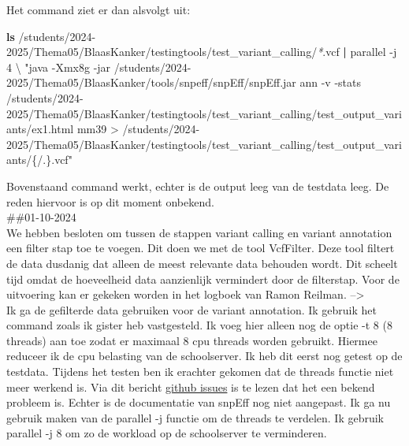 \documentclass[
]{article}
\newenvironment{Shaded}{\begin{snugshade}}{\end{snugshade}}
\newcommand{\AttributeTok}[1]{\textcolor[rgb]{0.13,0.29,0.53}{#1}}
\newcommand{\DataTypeTok}[1]{\textcolor[rgb]{0.13,0.29,0.53}{#1}}
\newcommand{\ExtensionTok}[1]{#1}
\newcommand{\FunctionTok}[1]{\textcolor[rgb]{0.13,0.29,0.53}{\textbf{#1}}}
\newcommand{\KeywordTok}[1]{\textcolor[rgb]{0.13,0.29,0.53}{\textbf{#1}}}
\newcommand{\NormalTok}[1]{#1}
\newcommand{\PreprocessorTok}[1]{\textcolor[rgb]{0.56,0.35,0.01}{\textit{#1}}}
\newcommand{\StringTok}[1]{\textcolor[rgb]{0.31,0.60,0.02}{#1}}
\begin{document}
Het command ziet er dan alsvolgt uit:\\

\begin{Shaded}
\begin{Highlighting}[]
\FunctionTok{ls}\NormalTok{ /students/2024{-}2025/Thema05/BlaasKanker/testingtools/test\_variant\_calling/}\PreprocessorTok{*}\NormalTok{.vcf }\KeywordTok{|} \ExtensionTok{parallel} \AttributeTok{{-}j}\NormalTok{ 4 }\DataTypeTok{\textbackslash{}}
\StringTok{"java {-}Xmx8g {-}jar /students/2024{-}2025/Thema05/BlaasKanker/tools/snpeff/snpEff/snpEff.jar ann {-}v {-}stats /students/2024{-}2025/Thema05/BlaasKanker/testingtools/test\_variant\_calling/test\_output\_variants/ex1.html mm39 \textgreater{} /students/2024{-}2025/Thema05/BlaasKanker/testingtools/test\_variant\_calling/test\_output\_variants/\{/.\}.vcf"}
\end{Highlighting}
\end{Shaded}

Bovenstaand command werkt, echter is de output leeg van de testdata
leeg. De reden hiervoor is op dit moment onbekend.\\

\#\#01-10-2024\\
We hebben besloten om tussen de stappen variant calling en variant
annotation een filter stap toe te voegen. Dit doen we met de tool
VcfFilter. Deze tool filtert de data dusdanig dat alleen de meest
relevante data behouden wordt. Dit scheelt tijd omdat de hoeveelheid
data aanzienlijk vermindert door de filterstap. Voor de uitvoering kan
er gekeken worden in het logboek van Ramon Reilman. --\textgreater{}\\

Ik ga de gefilterde data gebruiken voor de variant annotation. Ik
gebruik het command zoals ik gister heb vastgesteld. Ik voeg hier alleen
nog de optie -t 8 (8 threads) aan toe zodat er maximaal 8 cpu threads
worden gebruikt. Hiermee reduceer ik de cpu belasting van de
schoolserver. Ik heb dit eerst nog getest op de testdata. Tijdens het
testen ben ik erachter gekomen dat de threads functie niet meer werkend
is. Via dit bericht
\href{https://github.com/pcingola/SnpEff/issues/429}{github issues} is
te lezen dat het een bekend probleem is. Echter is de documentatie van
snpEff nog niet aangepast. Ik ga nu gebruik maken van de parallel -j
functie om de threads te verdelen. Ik gebruik parallel -j 8 om zo de
workload op de schoolserver te verminderen.\\
\end{document}
